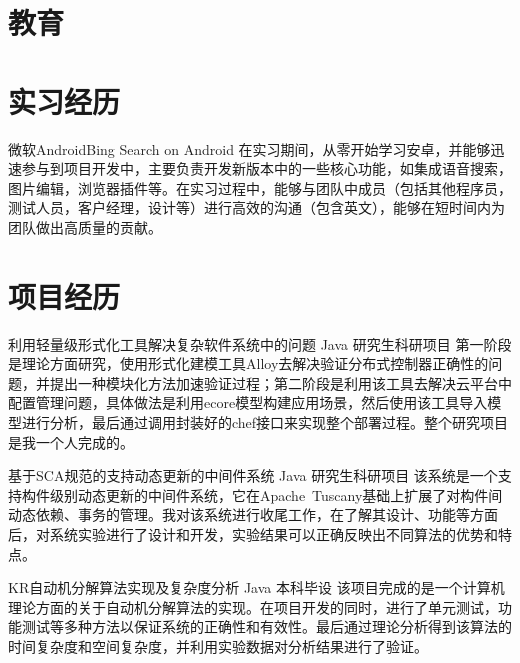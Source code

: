 \documentclass[11pt,a4paper]{moderncv}
\title{}               %
\begin{document}
\maketitle

\section{教育}

\section{实习经历}
{微软}{Android}{Bing Search on Android}{}
{在实习期间，从零开始学习安卓，并能够迅速参与到项目开发中，主要负责开发新版本中的一些核心功能，如集成语音搜索，图片编辑，浏览器插件等。在实习过程中，能够与团队中成员（包括其他程序员，测试人员，客户经理，设计等）进行高效的沟通（包含英文），能够在短时间内为团队做出高质量的贡献。}

\section{项目经历}
\renewcommand{\baselinestretch}{1.2}

{利用轻量级形式化工具解决复杂软件系统中的问题}
{Java}
{研究生科研项目}{}
{第一阶段是理论方面研究，使用形式化建模工具Alloy去解决验证分布式控制器正确性的问题，并提出一种模块化方法加速验证过程；第二阶段是利用该工具去解决云平台中配置管理问题，具体做法是利用ecore模型构建应用场景，然后使用该工具导入模型进行分析，最后通过调用封装好的chef接口来实现整个部署过程。整个研究项目是我一个人完成的。}

\vspace*{0.2\baselineskip}
{基于SCA规范的支持动态更新的中间件系统}
{Java}
{研究生科研项目}{}
{该系统是一个支持构件级别动态更新的中间件系统，它在Apache~Tuscany基础上扩展了对构件间动态依赖、事务的管理。我对该系统进行收尾工作，在了解其设计、功能等方面后，对系统实验进行了设计和开发，实验结果可以正确反映出不同算法的优势和特点。}

\vspace*{0.2\baselineskip}
{KR自动机分解算法实现及复杂度分析}
{Java}
{本科毕设}{}
{该项目完成的是一个计算机理论方面的关于自动机分解算法的实现。在项目开发的同时，进行了单元测试，功能测试等多种方法以保证系统的正确性和有效性。最后通过理论分析得到该算法的时间复杂度和空间复杂度，并利用实验数据对分析结果进行了验证。}
\end{document}
